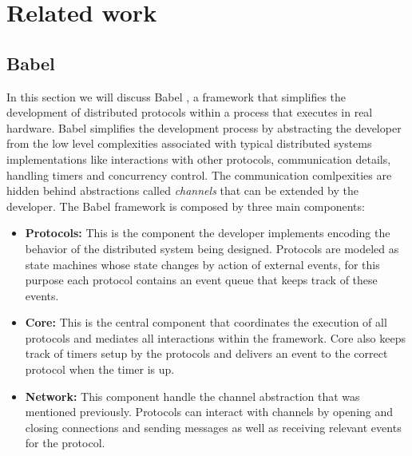 
%

\chapter{Related work}
\label{cha:related_work}

\section{Babel}
\label{sec:babel}

In this section we will discuss Babel \cite{babel}, a framework that simplifies the
development of distributed protocols within a process that executes in real hardware.
Babel simplifies the development process by abstracting the developer from the
low level complexities associated with typical distributed systems implementations like
interactions with other protocols, communication details, handling timers and concurrency control.
The communication comlpexities are hidden behind abstractions called \textit{channels}
that can be extended by the developer. The Babel framework is composed by three main components:

\begin{itemize}
  \item \textbf{Protocols:} This is the component the developer implements encoding
the behavior of the distributed system being designed. Protocols are modeled as
state machines whose state changes by action of external events, for this purpose
each protocol contains an event queue that keeps track of these events.
  \item \textbf{Core:} This is the central component that coordinates the
execution of all protocols and mediates all interactions within the framework.
Core also keeps track of timers setup by the protocols and delivers an event to the
correct protocol when the timer is up.
  \item \textbf{Network:} This component handle the channel abstraction that was
mentioned previously. Protocols can interact with channels by opening and closing connections
and sending messages as well as receiving relevant events for the protocol.
\end{itemize}

